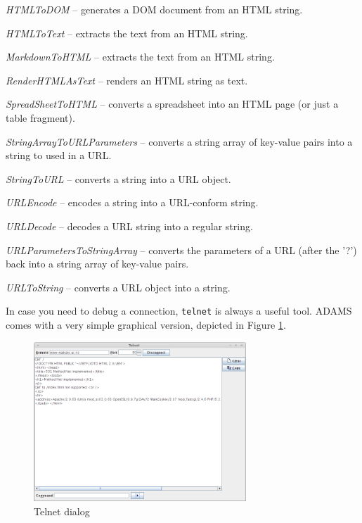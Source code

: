 \documentclass[a4paper]{book}
\begin{document}
\begin{tight_itemize}
    \item \textit{HTMLToDOM} -- generates a DOM document from an HTML string.
    \item \textit{HTMLToText} -- extracts the text from an HTML string.
    \item \textit{MarkdownToHTML} -- extracts the text from an HTML string.
    \item \textit{RenderHTMLAsText} -- renders an HTML string as text.
    \item \textit{SpreadSheetToHTML} -- converts a spreadsheet into an HTML
    page (or just a table fragment).
    \item \textit{StringArrayToURLParameters} -- converts a string array of
    key-value pairs into a string to used in a URL.
    \item \textit{StringToURL} -- converts a string into a URL object.
    \item \textit{URLEncode} -- encodes a string into a URL-conform string.
    \item \textit{URLDecode} -- decodes a URL string into a regular string.
    \item \textit{URLParametersToStringArray} -- converts the parameters of
    a URL (after the '?') back into a string array of key-value pairs.
    \item \textit{URLToString} -- converts a URL object into a string.
\end{tight_itemize}
In case you need to debug a connection, \texttt{telnet} is always a useful tool.
ADAMS comes with a very simple graphical version, depicted in Figure \ref{telnet}.
\begin{figure}[htb]
  \centering
  \includegraphics[width=8.0cm]{images/telnet.png}
  \caption{Telnet dialog}
  \label{telnet}
\end{figure}



\end{document}
